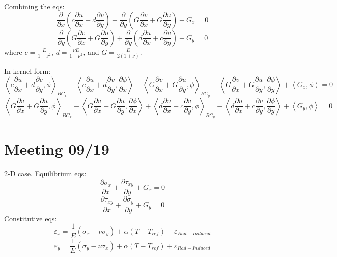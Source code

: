 \documentclass[11pt,letterpaper]{article}
\begin{document}
Combining the eqs:
\begin{equation}
\frac{\partial}{\partial x}(c \frac{\partial u}{\partial x} + d \frac{\partial v}{\partial y}) + \frac{\partial}{\partial y}(G \frac{\partial v}{\partial x} + G \frac{\partial u}{\partial y}) + G_x = 0
\end{equation}
\begin{equation}
\frac{\partial}{\partial y}(G \frac{\partial v}{\partial x} + G \frac{\partial u}{\partial y}) + \frac{\partial}{\partial y}(d \frac{\partial u}{\partial x} + c \frac{\partial v}{\partial y}) + G_y = 0
\end{equation}
where $c = \frac{E}{1-\nu^2}$, $d = \frac{\nu E}{1-\nu^2}$, and $G = \frac{E}{2(1+\nu)}$.

In kernel form:
\begin{equation}
\left< c \frac{\partial u}{\partial x} + d \frac{\partial v}{\partial y}, \phi \right>_{BC_x} - \left< c \frac{\partial u}{\partial x} + d \frac{\partial v}{\partial y}, \frac{\partial \phi}{\partial x} \right> + \left< G \frac{\partial v}{\partial x} + G \frac{\partial u}{\partial y}, \phi \right>_{BC_y} - \left< G \frac{\partial v}{\partial x} + G \frac{\partial u}{\partial y}, \frac{\partial \phi}{\partial y} \right>
+ \left< G_x , \phi \right> = 0
\end{equation}
\begin{equation}
\left< G \frac{\partial v}{\partial x} + G \frac{\partial u}{\partial y}, \phi \right>_{BC_x} - \left< G \frac{\partial v}{\partial x} + G \frac{\partial u}{\partial y}, \frac{\partial \phi}{\partial x} \right> +
\left< d \frac{\partial u}{\partial x} + c \frac{\partial v}{\partial y}, \phi \right>_{BC_y} - \left< d \frac{\partial u}{\partial x} + c \frac{\partial v}{\partial y}, \frac{\partial \phi}{\partial y} \right>
+ \left< G_y , \phi \right> = 0
\end{equation}

\section{Meeting 09/19}

2-D case.
Equilibrium eqs:
\begin{equation}
\frac{\partial \sigma_x}{\partial x} + \frac{\partial \tau_{xy}}{\partial y} + G_x = 0
\end{equation}
\begin{equation}
\frac{\partial \tau_{xy}}{\partial x} + \frac{\partial \sigma_y}{\partial y} + G_y = 0
\end{equation}
Constitutive eqs:
\begin{equation}
\varepsilon_x = \frac{1}{E} (\sigma_x - \nu \sigma_y) + \alpha (T-T_{ref}) + \varepsilon_{Rad-Induced}
\end{equation}
\begin{equation}
\varepsilon_y = \frac{1}{E} (\sigma_y - \nu \sigma_x) + \alpha (T-T_{ref}) + \varepsilon_{Rad-Induced}
\end{equation}
\end{document}
